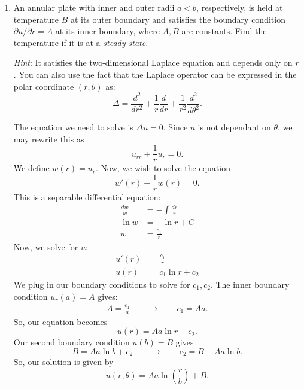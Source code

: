 \documentclass[10pt,letterpaper]{report}
\begin{document}
\begin{enumerate}
\begin{enumerate}
    \end{enumerate}
    
    \item
    \begin{qbox}
    An annular plate with inner and outer radii $a < b$, respectively, is held at temperature $B$ at its outer boundary and satisfies the boundary condition $\partial u/ \partial r = A$ at its inner boundary, where $A,B$ are constants. Find the temperature if it is at a \textit{steady state.}
    
    \textit{Hint}: It satisfies the two-dimensional Laplace equation and depends only on $r$. You can also use the fact that the Laplace operator can be expressed in the polar coordinate $(r,\theta)$ as:
    \[\Delta = \frac{d^2}{dr^2} + \frac{1}{r}\frac{d}{dr} + \frac{1}{r^2}\frac{d^2}{d\theta^2}.
    \]
    \end{qbox}
    
    The equation we need to solve is $\Delta u = 0$. Since $u$ is not dependant on $\theta$, we may rewrite this as
    \[
    u_{rr} + \frac{1}{r}u_r = 0.
    \]
    We define $w(r) = u_r$. Now, we wish to solve the equation
    \[
    w'(r) + \frac{1}{r}w(r) = 0.
    \]
    This is a separable differential equation:
    \begin{align*}
        \frac{dw}{w} &= -\int \frac{dr}{r}
        \\
        \ln w &= -\ln r + C
        \\
        w &= \frac{c_1}{r}
    \end{align*}
    Now, we solve for $u$:
    \begin{align*}
        u'(r) &= \frac{c_1}{r}
        \\
        u(r) &= c_1\ln r + c_2
    \end{align*}
    We plug in our boundary conditions to solve for $c_1,c_2$. The inner boundary condition $u_r(a) = A$ gives:
    \begin{align*}
        A = \frac{c_1}{a} \qquad \rightarrow \qquad c_1 = Aa.
    \end{align*}
    So, our equation becomes
    \[
    u(r) = Aa\ln r + c_2.
    \]
    Our second boundary condition $u(b) = B$ gives
    \[
    B = Aa \ln b + c_2 \qquad \rightarrow \qquad c_2 = B - Aa\ln b.
    \]
    So, our solution is given by
    \[
    u(r,\theta) = Aa\ln\left(\frac{r}{b}\right) + B.
    \]
    

\end{enumerate}
\end{document}
